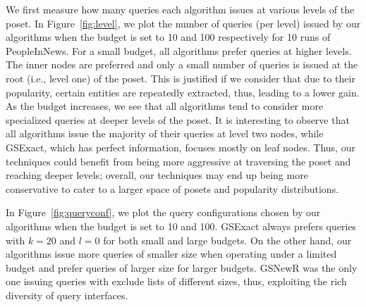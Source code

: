 We first measure how many queries each algorithm issues at various levels of the poset. In Figure~\ref{fig:level}, we plot the number of queries (per level) issued by our algorithms when the budget is set to 10 and 100 respectively for 10 runs of PeopleInNews. For a small budget, all algorithms prefer queries at higher levels. The inner nodes are preferred and only a small number of queries is issued at the root (i.e., level one) of the poset. This is justified if we consider that due to their popularity, certain entities are repeatedly extracted, thus, leading to a lower gain. As the budget increases, we see that all algorithms tend to consider more specialized queries at deeper levels of the poset. 
It is interesting to observe that all algorithms issue the majority of their queries at level two nodes, while GSExact, which has perfect information, focuses mostly on leaf nodes. Thus, our techniques could benefit from being more aggressive at traversing the poset and reaching deeper levels; overall, our techniques may end up being more conservative to cater to a larger space of posets and popularity distributions. 

In Figure~\ref{fig:queryconf}, we plot the query configurations chosen by our algorithms when the budget is set to 10 and 100. GSExact always prefers queries with $k = 20$ and $l = 0$ for both small and large budgets. On the other hand, our algorithms issue more queries of smaller size when operating under a limited budget and prefer queries of larger size for larger budgets. GSNewR was the only one issuing queries with exclude lists of different sizes, thus, exploiting the rich diversity of query interfaces.


